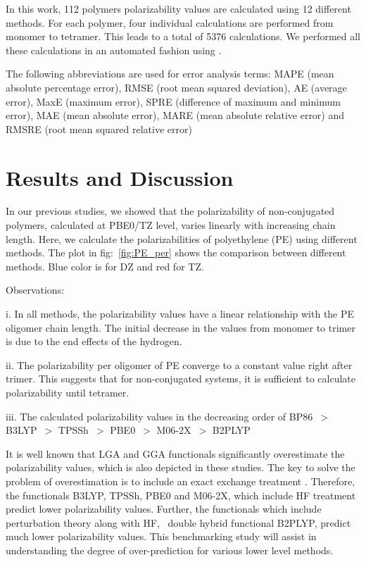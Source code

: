 In this work, 112 polymers polarizability values are calculated using 12 different methods. For each polymer, four individual calculations are performed from monomer to tetramer. This leads to a total of 5376 calculations. We performed all these calculations in an automated fashion using \chemhtps. 

The following abbreviations are used for error analysis terms:
MAPE (mean absolute percentage error),
RMSE (root mean squared deviation),
AE (average error),
MaxE (maximum error),
SPRE (difference of maximum and minimum error),
MAE (mean absolute error),
MARE (mean absolute relative error) and
RMSRE (root mean squared relative error)


\section{Results and Discussion}
\label{sec:results_discussion}

In our previous studies, we showed that the polarizability of non-conjugated polymers, calculated at PBE0/TZ level, varies linearly with increasing chain length. Here, we calculate the polarizabilities of polyethylene (PE) using different methods. The plot in fig:\ \ref{fig:PE_per} shows the comparison between different methods. Blue color is for DZ and red for TZ. 

Observations:

i. In all methods, the polarizability values have a linear relationship with the PE oligomer chain length. The initial decrease in the values from monomer to trimer is due to the end effects of the hydrogen.

ii. The polarizability per oligomer of PE converge to a constant value right after trimer. This suggests that for non-conjugated systems, it is sufficient to calculate polarizability until tetramer. 

iii. The calculated polarizability values in the decreasing order of BP86\ $>$ B3LYP\ $>$ TPSSh\ $>$ PBE0\ $>$ M06-2X\ $>$ B2PLYP

It is well known that LGA and GGA functionals significantly overestimate the polarizability values, which is also depicted in these studies. The key to solve the problem of overestimation is to include an exact exchange treatment \cite{Mori-Sanchez2003}. Therefore, the functionals  B3LYP, TPSSh, PBE0 and M06-2X, which include HF treatment predict lower polarizability values. Further, the functionals which include perturbation theory along with HF, \eg\ double hybrid functional B2PLYP, predict much lower polarizability values. 
This benchmarking study will assist in understanding the degree of over-prediction for various lower level methods.

